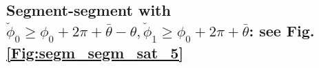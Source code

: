 \documentclass[reqno]{amsart}
\theoremstyle{definition} \newtheorem{definition}{Definition}[section]
\theoremstyle{definition} \newtheorem{remark}[definition]{Remark}
\theoremstyle{plain} \newtheorem{lemma}[definition]{Lemma}
\theoremstyle{plain} \newtheorem{proposition}[definition]{Proposition}
\theoremstyle{plain} \newtheorem{theorem}[definition]{Theorem}
\theoremstyle{plain} \newtheorem{corollary}[definition]{Corollary}
\theoremstyle{definition} \newtheorem{example}[definition]{Example}
\theoremstyle{plain} \newtheorem{claim}[clai]{Claim}
\theoremstyle{definition} \newtheorem{assumption}[definition]{Assumption}
\theoremstyle{definition} \newtheorem{observation}[definition]{Observation}
\newcommand{\1}{\mathbbm 1}
\numberwithin{equation}{section} %
\theoremstyle{plain} \newtheorem*{theorem*}{Theorem}
\theoremstyle{plain} \newtheorem{mthm}[maintheorem]{Main Theorem}
\theoremstyle{plain} \newtheorem*{mthm*}{Main Theorem}
\theoremstyle{plain} \newtheorem*{conjecture*}{Conjecture}
\theoremstyle{plain} \newtheorem{conjecture}[definition]{Conjecture}
\theoremstyle{plain} \newtheorem*{problem*}{Problem}
\begin{document}
%
%
%
%
%
%


\subsection{Segment-segment with \texorpdfstring{$\check \phi_0 \geq \phi_0 + 2\pi + \bar \theta - \theta, \check \phi_1 \geq \phi_0 + 2\pi + \bar \theta$}{check phi0 geq phi0 + 2pi + bar theta - theta, check phi1 geq phi0 + 2pi + bar theta}: see Fig. \ref{Fig:segm_segm_sat_5}}
\label{Sss:segm_semg_after_neg_5}
\end{document}
